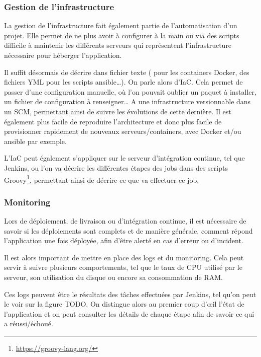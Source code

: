 \subsubsection{Gestion de l'infrastructure}

La gestion de l'infrastructure fait également partie de l'automatisation d'un projet. Elle permet de ne plus avoir à configurer à la main ou via des scripts difficile à maintenir les différents serveurs qui représentent l'infrastructure nécessaire pour héberger l'application.

Il suffit désormais de décrire dans fichier texte ( pour les containers Docker, des fichiers YML pour les scripts ansible\ldots). On parle alors d'\gls{IaC}. Cela permet de passer d'une configuration manuelle, où l'on pouvait oublier un paquet à installer, un fichier de configuration à renseigner\ldots{} A une infrastructure versionnable dans un \gls{SCM}, permettant ainsi de suivre les évolutions de cette dernière. Il est également plus facile de reproduire l'architecture et donc plus facile de provisionner rapidement de nouveaux serveurs/containers, avec Docker et/ou ansible par exemple.

L'\gls{IaC} peut également s'appliquer sur le serveur d'intégration continue, tel que Jenkins, ou l'on va décrire les différentes étapes des jobs dans des scripts Groovy\footnote{\url{https://groovy-lang.org/}}, permettant ainsi de décrire ce que va effectuer ce job.

\subsubsection{Monitoring}\label{paragraph:monitoring}

Lors de déploiement, de livraison ou d'intégration continue, il est nécessaire de savoir si les déploiements sont complets et de manière générale, comment répond l'application une fois déployée, afin d'être alerté en cas d'erreur ou d'incident.

Il est alors important de mettre en place des logs et du monitoring. Cela peut servir à suivre plusieurs comportements, tel que le taux de \gls{CPU} utilisé par le serveur, son utilisation du disque ou encore sa consommation de \gls{RAM}.

Ces logs peuvent être le résultats des tâches effectuées par Jenkins, tel qu'on peut le voir sur la figure TODO. On distingue alors au premier coup d'œil l'état de l'application et on peut consulter les détails de chaque étape afin de savoir ce qui a réussi/échoué.

